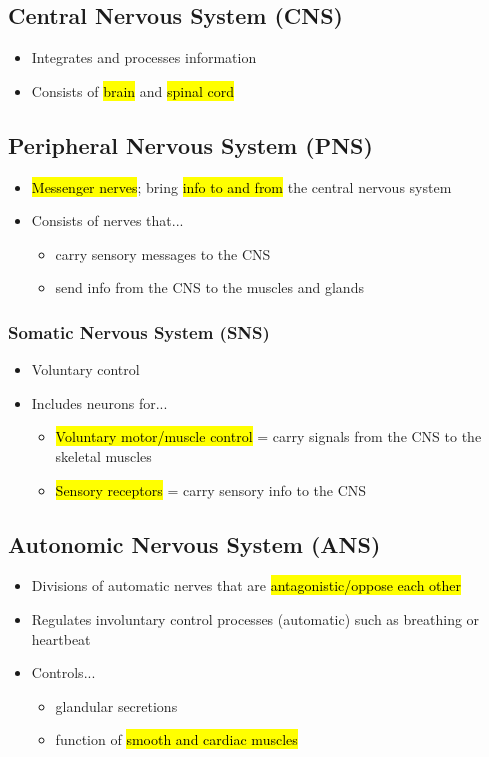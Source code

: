 \documentclass[a4paper,12pt]{article}
\begin{document}
\subsection{Central Nervous System (CNS)}
\begin{itemize}
    \item{Integrates and processes information}
    \item{Consists of \hl{brain} and \hl{spinal cord}}
\end{itemize}

\subsection{Peripheral Nervous System (PNS)}
\begin{itemize}
    \item{\hl{Messenger nerves}; bring \hl{info to and from} the central nervous system}
    \item{
            Consists of nerves that...
            \begin{itemize}
                \item{carry sensory messages to the CNS}
                \item{send info from the CNS to the muscles and glands}
            \end{itemize}
        }
\end{itemize}

\subsubsection{Somatic Nervous System (SNS)}
\begin{itemize}
    \item{Voluntary control}
    \item{
            Includes neurons for...
            \begin{itemize}
                \item{\hl{Voluntary motor/muscle control} = carry signals from the CNS to the skeletal muscles}
                \item{\hl{Sensory receptors} = carry sensory info to the CNS}
            \end{itemize}
        }
\end{itemize}

\subsection{Autonomic Nervous System (ANS)}
\begin{itemize}
    \item{Divisions of automatic nerves that are \hl{antagonistic/oppose each other}}
    \item{Regulates involuntary control processes (automatic) such as breathing or heartbeat}
    \item{
            Controls...
            \begin{itemize}
                \item{glandular secretions}
                \item{function of \hl{smooth and cardiac muscles}}
            \end{itemize}
        }
\end{itemize}
\end{document}
